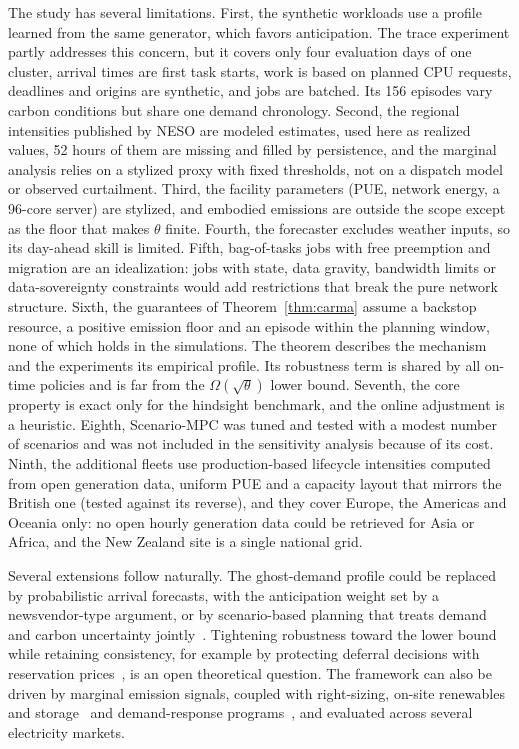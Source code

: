 The study has several limitations. First, the synthetic workloads use a profile learned from the same generator, which favors anticipation. The trace experiment partly addresses this concern, but it covers only four evaluation days of one cluster, arrival times are first task starts, work is based on planned CPU requests, deadlines and origins are synthetic, and jobs are batched. Its 156 episodes vary carbon conditions but share one demand chronology. Second, the regional intensities published by NESO are modeled estimates, used here as realized values, 52 hours of them are missing and filled by persistence, and the marginal analysis relies on a stylized proxy with fixed thresholds, not on a dispatch model or observed curtailment. Third, the facility parameters (PUE, network energy, a 96-core server) are stylized, and embodied emissions are outside the scope except as the floor that makes $\theta$ finite. Fourth, the forecaster excludes weather inputs, so its day-ahead skill is limited. Fifth, bag-of-tasks jobs with free preemption and migration are an idealization: jobs with state, data gravity, bandwidth limits or data-sovereignty constraints would add restrictions that break the pure network structure. Sixth, the guarantees of Theorem~\ref{thm:carma} assume a backstop resource, a positive emission floor and an episode within the planning window, none of which holds in the simulations. The theorem describes the mechanism and the experiments its empirical profile. Its robustness term is shared by all on-time policies and is far from the $\Omega(\sqrt\theta)$ lower bound. Seventh, the core property is exact only for the hindsight benchmark, and the online adjustment is a heuristic. Eighth, Scenario-MPC was tuned and tested with a modest number of scenarios and was not included in the sensitivity analysis because of its cost. Ninth, the additional fleets use production-based lifecycle intensities computed from open generation data, uniform PUE and a capacity layout that mirrors the British one (tested against its reverse), and they cover Europe, the Americas and Oceania only: no open hourly generation data could be retrieved for Asia or Africa, and the New Zealand site is a single national grid.

Several extensions follow naturally. The ghost-demand profile could be replaced by probabilistic arrival forecasts, with the anticipation weight set by a newsvendor-type argument, or by scenario-based planning that treats demand and carbon uncertainty jointly~\cite{bertsimas2004price}. Tightening robustness toward the lower bound while retaining consistency, for example by protecting deferral decisions with reservation prices~\cite{elyaniv2001optimal,lechowicz2025learning}, is an open theoretical question. The framework can also be driven by marginal emission signals, coupled with right-sizing, on-site renewables and storage~\cite{souza2023ecovisor,acun2023carbon} and demand-response programs~\cite{wierman2014opportunities}, and evaluated across several electricity markets.

